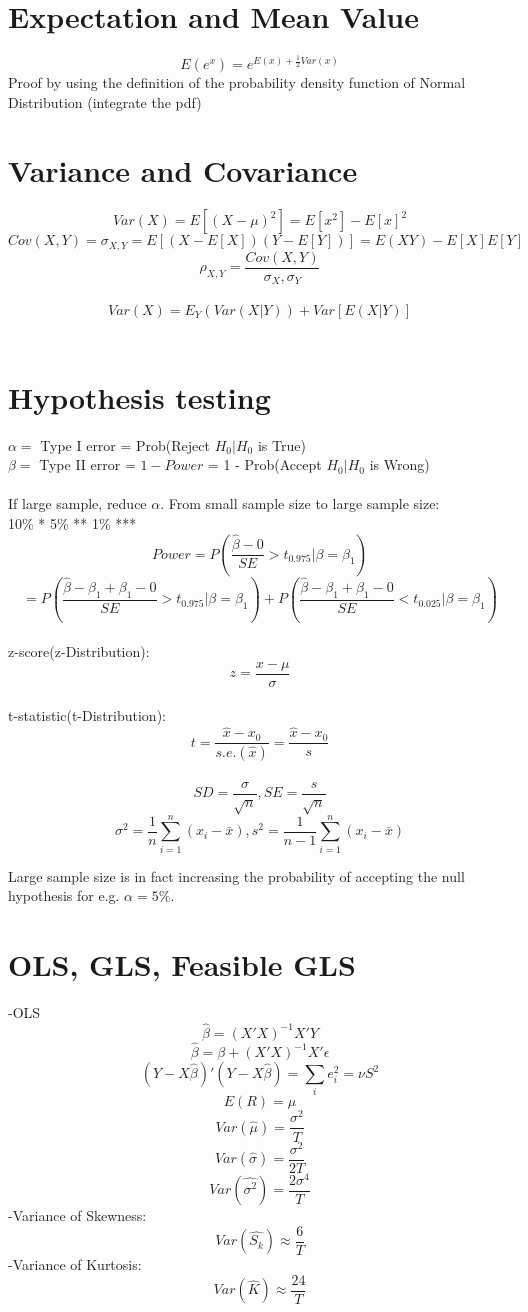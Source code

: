 \documentclass[12pt]{article}
\begin{document}
\section{Expectation and Mean Value}
$$E(e^x)=e^{E(x)+\frac{1}{2}Var(x)}$$
Proof by using the definition of the probability density function of Normal Distribution (integrate the pdf)


\section{Variance and Covariance}
$$Var(X)=E[(X-\mu)^2]=E[x^2]-E[x]^2$$
$$Cov(X,Y)=\sigma_{X,Y}=E[(X-E[X])(Y-E[Y])]=E(XY)-E[X]E[Y]$$
$$\rho_{X,Y}=\frac{Cov(X,Y)}{\sigma_X,\sigma_Y}$$
\\
$$Var(X)=E_Y(Var(X|Y))+Var[E(X|Y)]$$
\\


\section{Hypothesis testing}
$\alpha=$ Type I error = Prob(Reject $H_0 | H_0$ is True)
\\
$\beta=$ Type II error = $1-Power$ = 1 - Prob(Accept $H_0 | H_0$ is Wrong)
\\
\\
If large sample, reduce $\alpha$. From small sample size to large sample size: \\
10\% *     5\% **    1\% ***
\\
$$Power=P(\frac{\hat{\beta} -0}{SE}>t_{0.975}|\beta=\beta_1)$$
$$=P(\frac{\hat{\beta} - \beta_1+\beta_1-0}{SE}>t_{0.975}|\beta=\beta_1)+P(\frac{\hat{\beta} - \beta_1+\beta_1-0}{SE}<t_{0.025}|\beta=\beta_1)$$
\\
z-score(z-Distribution): $$z=\frac{x-\mu}{\sigma}$$
\\
t-statistic(t-Distribution): $$t=\frac{\hat{x}-x_0}{s.e.(\hat{x})}=\frac{\hat{x}-x_0}{s}$$
\\
$$SD=\frac{\sigma}{\sqrt{n}}, SE=\frac{s}{\sqrt{n}}$$
$$\sigma^2=\frac{1}{n}\sum_{i=1}^n (x_i-\bar{x}),s^2=\frac{1}{n-1}\sum_{i=1}^n (x_i-\bar{x})$$

Large sample size is in fact increasing the probability of accepting the null hypothesis for e.g. $\alpha=5\%$.



\section{OLS, GLS, Feasible GLS}
-OLS\\
$$\hat{\beta}=(X'X)^{-1}X'Y$$
$$\hat{\beta}=\beta+(X'X)^{-1}X'\epsilon $$
$$(Y-X\hat{\beta})'(Y-X\hat{\beta})=\sum_i e_i^2=\nu S^2$$
$$E(R)=\mu$$
$$Var(\hat{\mu})=\frac{\sigma^2}{T}$$
$$Var(\hat{\sigma})=\frac{\sigma^2}{2T}$$
$$Var(\hat{\sigma^2})=\frac{2\sigma^4}{T}$$
-Variance of Skewness:
$$Var(\hat{S_k})\approx\frac{6}{T}$$
-Variance of Kurtosis:
$$Var(\hat{K})\approx\frac{24}{T}$$
\end{document}
